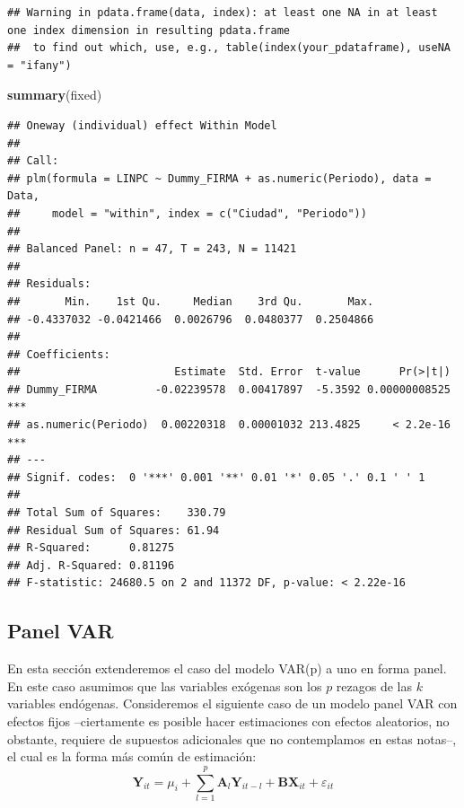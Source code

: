 \documentclass[
]{book}
\newenvironment{Shaded}{\begin{snugshade}}{\end{snugshade}}
\newcommand{\FunctionTok}[1]{\textcolor[rgb]{0.13,0.29,0.53}{\textbf{#1}}}
\newcommand{\NormalTok}[1]{#1}
\begin{document}
\begin{verbatim}
## Warning in pdata.frame(data, index): at least one NA in at least one index dimension in resulting pdata.frame
##  to find out which, use, e.g., table(index(your_pdataframe), useNA = "ifany")
\end{verbatim}

\begin{Shaded}
\begin{Highlighting}[]
\FunctionTok{summary}\NormalTok{(fixed)}
\end{Highlighting}
\end{Shaded}

\begin{verbatim}
## Oneway (individual) effect Within Model
## 
## Call:
## plm(formula = LINPC ~ Dummy_FIRMA + as.numeric(Periodo), data = Data, 
##     model = "within", index = c("Ciudad", "Periodo"))
## 
## Balanced Panel: n = 47, T = 243, N = 11421
## 
## Residuals:
##       Min.    1st Qu.     Median    3rd Qu.       Max. 
## -0.4337032 -0.0421466  0.0026796  0.0480377  0.2504866 
## 
## Coefficients:
##                        Estimate  Std. Error  t-value      Pr(>|t|)    
## Dummy_FIRMA         -0.02239578  0.00417897  -5.3592 0.00000008525 ***
## as.numeric(Periodo)  0.00220318  0.00001032 213.4825     < 2.2e-16 ***
## ---
## Signif. codes:  0 '***' 0.001 '**' 0.01 '*' 0.05 '.' 0.1 ' ' 1
## 
## Total Sum of Squares:    330.79
## Residual Sum of Squares: 61.94
## R-Squared:      0.81275
## Adj. R-Squared: 0.81196
## F-statistic: 24680.5 on 2 and 11372 DF, p-value: < 2.22e-16
\end{verbatim}

\hypertarget{panel-var}{%
\subsection{Panel VAR}\label{panel-var}}

En esta sección extenderemos el caso del modelo VAR(p) a uno en forma panel. En este caso asumimos que las variables exógenas son los \(p\) rezagos de las \(k\) variables endógenas. Consideremos el siguiente caso de un modelo panel VAR con efectos fijos --ciertamente es posible hacer estimaciones con efectos aleatorios, no obstante, requiere de supuestos adicionales que no contemplamos en estas notas--, el cual es la forma más común de estimación:
\begin{equation}
    \mathbf{Y}_{it} = \mu_i + \sum_{l = 1}^p \mathbf{A}_l \mathbf{Y}_{i t - l} + \mathbf{B} \mathbf{X}_{it} + \varepsilon_{it}
   \label{eq:eqPVAR}
\end{equation}
\end{document}
